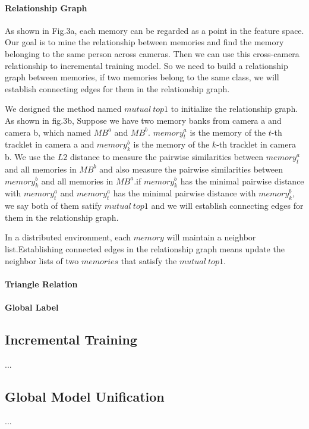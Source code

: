 \documentclass{article}
\begin{document}
\paragraph{Relationship Graph}As shown in Fig.3a, each memory can be regarded as a point in the feature space. Our goal is to mine the relationship between memories and find the memory belonging to the same person across cameras. Then we can use this cross-camera relationship to incremental training model. So we need to build a relationship graph between memories, if two memories belong to the same class, we will establish connecting edges for them in the relationship graph.


We designed the method named $mutual \ top1$ to initialize the relationship graph. As shown in fig.3b, Suppose we have two memory banks from camera a and camera b, which named $MB^{a}$ and $MB^{b}$. $memory_{t}^{a}$ is the memory of the $t$-th tracklet in camera a and $memory_{k}^{b}$ is the memory of the $k$-th tracklet in camera b. We use the $L2$ distance to measure the pairwise similarities between $memory_{t}^{a}$ and all memories in $MB^{b}$ and also measure the pairwise similarities between $memory_{k}^{b}$ and all memories in $MB^{a}$.if $memory_{k}^{b}$ has the  minimal pairwise distance with $memory_{t}^{a}$ and  $memory_{t}^{a}$ has the minimal pairwise distance with $memory_{k}^{b}$, we say both of them satify $mutual \ top1$ and we will establish connecting edges for them in the relationship graph.

In a distributed environment, each $memory$ will maintain a neighbor list.Establishing connected edges in the relationship graph means update the neighbor lists of two $memories$ that satisfy the $mutual \ top1$.

\paragraph{Triangle Relation}

\paragraph{Global Label}

\subsection{Incremental Training}
...
\subsection{Global Model Unification}
...
\end{document}
